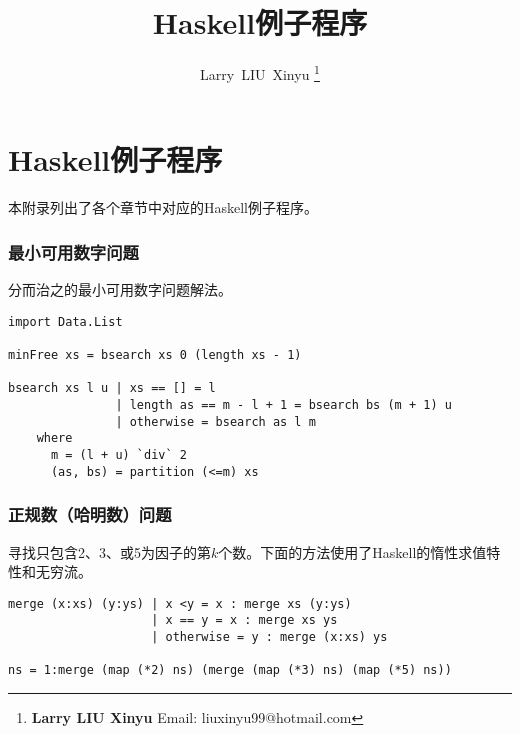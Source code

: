 \documentclass{ctexart}
\begin{document}


\title{Haskell例子程序}

\author{Larry~LIU~Xinyu
\thanks{{\bfseries Larry LIU Xinyu } \newline
  Email: liuxinyu99@hotmail.com \newline}
  }

\maketitle
\fi


\ifx\wholebook\relax
\chapter{Haskell例子程序}
\fi

本附录列出了各个章节中对应的Haskell例子程序。

\subsection{最小可用数字问题}
分而治之的最小可用数字问题解法。

\lstset{language=Haskell, frame=single}
\begin{lstlisting}
import Data.List

minFree xs = bsearch xs 0 (length xs - 1)

bsearch xs l u | xs == [] = l
               | length as == m - l + 1 = bsearch bs (m + 1) u
               | otherwise = bsearch as l m
    where
      m = (l + u) `div` 2
      (as, bs) = partition (<=m) xs
\end{lstlisting}

\subsection{正规数（哈明数）问题}
寻找只包含2、3、或5为因子的第$k$个数。下面的方法使用了Haskell的惰性求值特性和无穷流。

\begin{lstlisting}
merge (x:xs) (y:ys) | x <y = x : merge xs (y:ys)
                    | x == y = x : merge xs ys
                    | otherwise = y : merge (x:xs) ys

ns = 1:merge (map (*2) ns) (merge (map (*3) ns) (map (*5) ns))
\end{lstlisting}
\end{document}
